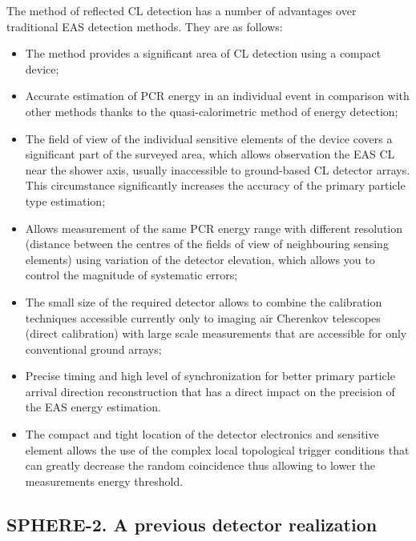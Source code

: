 \documentclass[a4paper,11pt]{article}
\begin{document}
The method of reflected CL detection has a number of advantages over traditional EAS detection methods. They are as follows:
\begin{itemize}
\item The method provides a significant area of CL detection using a compact device;
\item Accurate estimation of PCR energy in an individual event in comparison with other methods thanks to the quasi-calorimetric method of energy detection;
\item The field of view of the individual sensitive elements of the device covers a significant part of the surveyed area, which allows observation the EAS CL near the shower axis, usually inaccessible to ground-based CL detector arrays. This circumstance significantly increases the accuracy of the primary particle type estimation;
\item Allows measurement of the same PCR energy range with different resolution (distance between the centres of the fields of view of neighbouring sensing elements) using variation of the detector elevation, which allows you to control the magnitude of systematic errors;
\item The small size of the required detector allows to combine the calibration techniques accessible currently only to imaging air Cherenkov telescopes (direct calibration) with large scale measurements that are accessible for only conventional ground arrays;
\item Precise timing and high level of synchronization for better primary particle arrival direction reconstruction that has a direct impact on the precision of the EAS energy estimation.
\item The compact and tight location of the detector electronics and sensitive element allows the use of the  complex local topological trigger conditions that can greatly decrease the random coincidence thus allowing to lower the measurements energy threshold.
\end{itemize}

\subsection{SPHERE-2. A previous detector realization}
\end{document}
